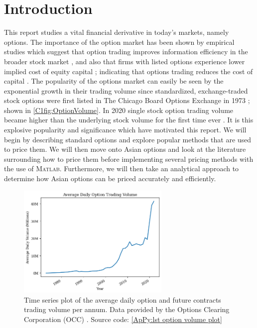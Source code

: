 \chapter{Introduction}

This report studies a vital financial derivative in today's markets, namely options. The importance of the option market has been shown by empirical studies which suggest that option trading improves information efficiency in the broader stock market \cite{PanInfoEffic,li2021effect}, and also that firms with listed options experience lower implied cost of equity capital \cite{naikerLowEquity}; indicating that options trading reduces the cost of capital \cite{li2021effect}. The popularity of the options market can easily be seen by the exponential growth in their trading volume since standardized, exchange-traded stock options were first listed in The Chicago Board Options Exchange in 1973 \cite{markham2002financial}; shown in \autoref{C1fig:OptionVolume}. In 2020 single stock option trading volume became higher than the underlying stock volume for the first time ever \cite{yahooOptions}. 
\nline
It is this explosive popularity and significance which have motivated this report. We will begin by describing standard options and explore popular methods that are used to price them. We will then move onto Asian options and look at the literature surrounding how to price them before implementing several pricing methods with the use of \textsc{Matlab}. Furthermore, we will then take an analytical approach to determine how Asian options can be priced accurately and efficiently.

\begin{figure}[H]
    \centering
    \includegraphics[width=0.65\textwidth]{Chapters/C1/plots/OptionVolume.png}
    \caption{Time series plot of the average daily option and future contracts trading volume per annum. Data provided by the Options Clearing Corporation (OCC) \cite{THEOCC}. 
    Source code: \autoref{ApPy:lst option volume plot}
    }
    \label{C1fig:OptionVolume}
\end{figure}

